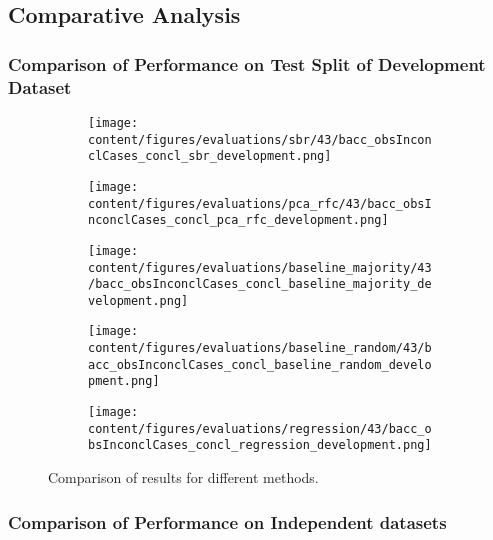 \subsection{Comparative Analysis}
\label{subsec:compar_anal}


\subsubsection{Comparison of Performance on Test Split of Development Dataset}
\label{subsubsec:perf_comp_dev}



\begin{figure}[t]
  \begin{subfigure}{0.5\textwidth}
    \centering
    \texttt{[image: content/figures/evaluations/sbr/43/bacc\_obsInconclCases\_concl\_sbr\_development.png]}
    \label{fig:test1}
  \end{subfigure}
  \hfill
  \begin{subfigure}{0.5\textwidth}
    \centering
    \texttt{[image: content/figures/evaluations/pca\_rfc/43/bacc\_obsInconclCases\_concl\_pca\_rfc\_development.png]}
    \label{fig:test2}
  \end{subfigure}
  \hfill
  \begin{subfigure}{0.5\textwidth}
    \centering
    \texttt{[image: content/figures/evaluations/baseline\_majority/43/bacc\_obsInconclCases\_concl\_baseline\_majority\_development.png]}
    \label{fig:test3}
  \end{subfigure}
  \hfill
  \begin{subfigure}{0.5\textwidth}
    \centering
    \texttt{[image: content/figures/evaluations/baseline\_random/43/bacc\_obsInconclCases\_concl\_baseline\_random\_development.png]}
    \label{fig:test4}
  \end{subfigure}
  \hfill
  \begin{subfigure}{0.5\textwidth}
    \centering
    \texttt{[image: content/figures/evaluations/regression/43/bacc\_obsInconclCases\_concl\_regression\_development.png]}
    \label{fig:test5}
  \end{subfigure}

  \caption{Comparison of results for different methods.}
  \label{fig:test}
\end{figure}



\subsubsection{Comparison of Performance on Independent datasets}
\label{subsubsec:perf_comp_indep}


